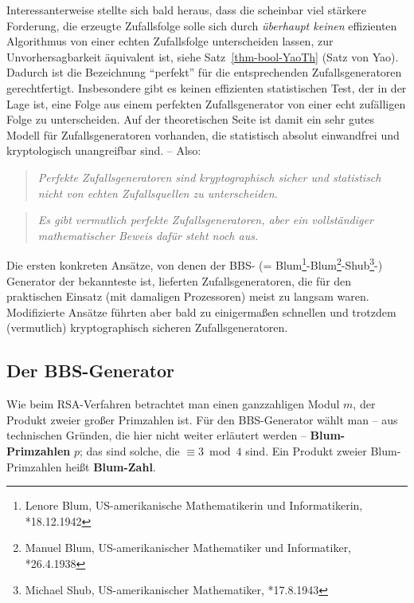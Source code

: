 \begin{refsegment}
Interessanterweise stellte sich bald heraus, dass die scheinbar viel
stärkere Forderung, die erzeugte Zufallsfolge solle sich durch
{\em überhaupt keinen} effizienten Algorithmus von einer echten
Zufallsfolge unterscheiden lassen, zur
Unvorhersagbarkeit äquivalent
ist, siehe Satz~\ref{thm-bool-YaoTh} (Satz von Yao). Dadurch ist
die Bezeichnung "`perfekt"' für die entsprechenden Zufallsgeneratoren
gerechtfertigt. Insbesondere gibt es keinen effizienten
statistischen Test,
der in der Lage ist, eine Folge aus einem perfekten Zufallsgenerator
von einer echt zufälligen Folge zu unterscheiden.
Auf der theoretischen Seite ist damit ein sehr gutes Modell
für Zufallsgeneratoren vorhanden, die statistisch absolut einwandfrei und
kryptologisch unangreifbar sind. -- Also:
\begin{quote}
   {\em Perfekte
   Zufallsgeneratoren
   sind kryptographisch sicher
   und statistisch nicht von echten Zufallsquellen zu unterscheiden.}
\end{quote}
\begin{quote}
   {\em Es gibt vermutlich perfekte Zufallsgeneratoren, aber ein
   vollständiger mathematischer Beweis dafür steht noch aus.}
\end{quote}

Die ersten konkreten Ansätze, von denen der BBS- (= Blum\footnote{%
Lenore Blum, US-amerikanische Mathematikerin und Informatikerin, *18.12.1942
}-Blum\footnote{%
Manuel Blum, US-amerikanischer Mathematiker und Informatiker, *26.4.1938
}-Shub\footnote{%
Michael Shub, US-amerikanischer Mathematiker, *17.8.1943
}-)
Generator der bekannteste ist, lieferten Zufallsgeneratoren, die für den
praktischen Einsatz (mit damaligen Prozessoren) meist zu langsam waren.
Modifizierte Ansätze führten aber bald zu einigermaßen schnellen und
trotzdem (vermutlich) kryptographisch sicheren Zufallsgeneratoren.

\subsection{Der BBS-Generator}\label{ss-bool-bbs}

Wie beim RSA-Verfahren betrachtet man einen ganzzahligen Modul $m$, der
Produkt zweier großer Primzahlen ist. Für den BBS-Generator wählt man
-- aus technischen Gründen, die hier nicht weiter erläutert werden --
\textbf{Blum-Primzahlen} $p$; das sind solche, die $\equiv 3 \bmod 4$
sind. Ein Produkt zweier Blum-Primzahlen heißt \textbf{Blum-Zahl}.


\end{refsegment}
